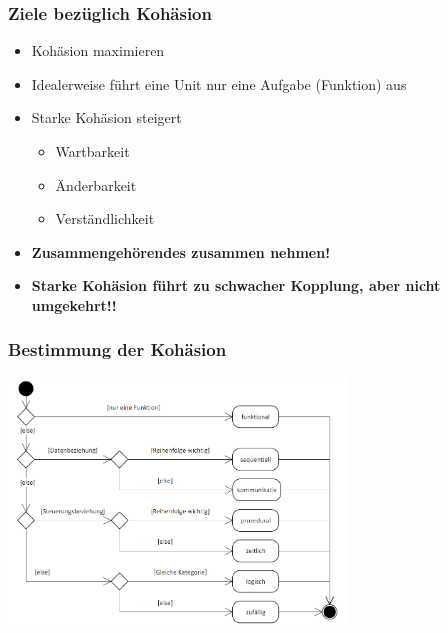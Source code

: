 \begin{minipage}{9cm}
\subsubsection{Ziele bezüglich Kohäsion}
  \begin{itemize}
  \item Kohäsion maximieren
  \item Idealerweise führt eine Unit nur eine Aufgabe (Funktion) aus
  \item Starke Kohäsion steigert
    \begin{itemize}
    \item Wartbarkeit
    \item Änderbarkeit
    \item Verständlichkeit
    \end{itemize}
  \item \textbf{Zusammengehörendes zusammen nehmen!}
  \item \textbf{Starke Kohäsion führt zu schwacher Kopplung, aber nicht umgekehrt!!}
  \end{itemize}
\end{minipage}
\hfill
\begin{minipage}{9cm}
  \subsubsection{Bestimmung der Kohäsion}
  \includegraphics[width=9cm]{images/Modularisierung/Kohaesionsbestimmung.png}
\end{minipage}

